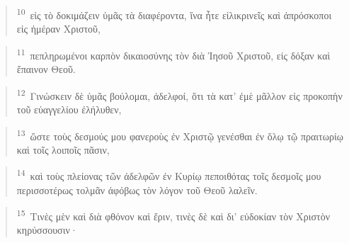 \documentclass{article}
\newcommand{\currentverse}{1} %
\newcommand{\setcurrentverse}[1]{\renewcommand{\currentverse}{#1}}
\begin{document}
\begin{verse}

\setcurrentverse{10}

\setcounter{footnote}{0}

\textsuperscript{10}~εἰς τὸ δοκιμάζειν ὑμᾶς τὰ διαφέροντα, ἵνα ἦτε εἰλικρινεῖς καὶ ἀπρόσκοποι εἰς ἡμέραν Χριστοῦ,

\end{verse}

\begin{verse}

\setcurrentverse{11}

\setcounter{footnote}{0}

\textsuperscript{11}~πεπληρωμένοι καρπὸν δικαιοσύνης τὸν διὰ Ἰησοῦ Χριστοῦ, εἰς δόξαν καὶ ἔπαινον Θεοῦ.

\end{verse}

\begin{verse}

\setcurrentverse{12}

\setcounter{footnote}{0}

\textsuperscript{12}~Γινώσκειν δὲ ὑμᾶς βούλομαι, ἀδελφοί, ὅτι τὰ κατ’ ἐμὲ μᾶλλον εἰς προκοπὴν τοῦ εὐαγγελίου ἐλήλυθεν,

\end{verse}

\begin{verse}

\setcurrentverse{13}

\setcounter{footnote}{0}

\textsuperscript{13}~ὥστε τοὺς δεσμούς μου φανεροὺς ἐν Χριστῷ γενέσθαι ἐν ὅλῳ τῷ πραιτωρίῳ καὶ τοῖς λοιποῖς πᾶσιν,

\end{verse}

\begin{verse}

\setcurrentverse{14}

\setcounter{footnote}{0}

\textsuperscript{14}~καὶ τοὺς πλείονας τῶν ἀδελφῶν ἐν Κυρίῳ πεποιθότας τοῖς δεσμοῖς μου περισσοτέρως τολμᾶν ἀφόβως τὸν λόγον τοῦ Θεοῦ λαλεῖν.

\end{verse}

\begin{verse}

\setcurrentverse{15}

\setcounter{footnote}{0}

\textsuperscript{15}~Τινὲς μὲν καὶ διὰ φθόνον καὶ ἔριν, τινὲς δὲ καὶ δι’ εὐδοκίαν τὸν Χριστὸν κηρύσσουσιν·

\end{verse}
\end{document}
